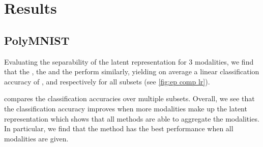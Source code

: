 \chapter{Results}




\section{PolyMNIST} \label{subsec: results polymnist}
Evaluating the separability of the latent representation for 3 modalities, we find that the , the  and the  perform similarly, yielding on average a linear classification accuracy of ,  and  respectively for all subsets (see \cref{fig:ep comp lr}).

\smallskip

 compares the classification accuracies over multiple subsets.
Overall, we see that the classification accuracy improves when more modalities make up the latent representation which shows that all methods are able to aggregate the modalities.
In particular, we find that the  method has the best performance when all modalities are given.



\begin{sansmath}
\end{sansmath}


